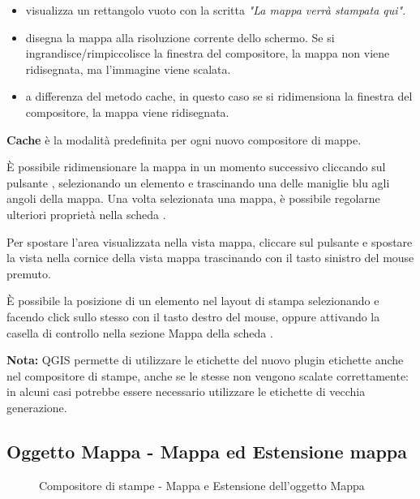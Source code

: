 \begin{itemize}[label=--]
\item {} visualizza un rettangolo vuoto con 
la scritta \textit{"La mappa verrà stampata qui"}.
\item {} disegna la mappa alla risoluzione corrente dello schermo.
 Se si ingrandisce/rimpiccolisce la finestra del compositore, la mappa non viene ridisegnata, ma 
l'immagine viene scalata.
\item {} a differenza del metodo cache, in questo caso se si 
ridimensiona la finestra del compositore, la mappa viene ridisegnata.
\end{itemize}

\textbf{Cache} è la modalità predefinita per ogni nuovo compositore di mappe.

È possibile ridimensionare la mappa in un momento successivo cliccando sul
pulsante , selezionando
un elemento e trascinando una delle maniglie blu agli angoli della mappa. Una volta selezionata una mappa,
è possibile regolarne ulteriori proprietà nella scheda . 

Per spostare l'area visualizzata nella vista mappa,
cliccare sul pulsante  e spostare la vista nella cornice della vista mappa trascinando con
il tasto sinistro del mouse premuto.

È possibile  la posizione di un elemento 
nel layout di stampa selezionando e facendo click sullo stesso con il tasto destro del mouse, 
oppure attivando la casella di controllo  nella sezione 
Mappa della scheda .

\textbf{Nota:} QGIS \CURRENT permette di utilizzare le etichette del nuovo plugin etichette 
anche nel compositore di stampe, anche se le stesse non vengono scalate correttamente: in alcuni casi 
potrebbe essere necessario utilizzare le etichette di vecchia generazione.

\subsection{Oggetto Mappa - Mappa ed Estensione mappa}

\begin{figure}[ht]
  \centering
    \hspace{1cm}
  \caption{Compositore di stampe - Mappa e Estensione dell'oggetto Mappa \nixcaption}\label{fig:mapdialog}
\end{figure}


